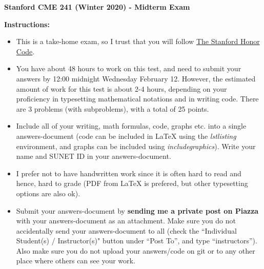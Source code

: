 \documentclass[12pt]{exam}
\begin{document}
\begin{center}
{\large {\bf Stanford CME 241 (Winter 2020) - Midterm Exam}}
\end{center}
{\large{\bf Instructions:}}
\begin{itemize}
\item This is a take-home exam, so I trust that you will follow \href{https://communitystandards.stanford.edu/policies-and-guidance/honor-code}{The Stanford Honor Code}.
\item You have about 48 hours to work on this test, and need to submit your answers by 12:00 midnight Wednesday February 12. However, the estimated amount of work for this test is about 2-4 hours, depending on your proficiency in typesetting mathematical notations and in writing code. There are 3 problems (with subproblems), with a total of 25 points.
\item Include all of your writing, math formulas, code, graphs etc. into a single answers-document (code can be included in LaTeX using the {\em lstlisting} environment, and graphs can be included using {\em includegraphics}). Write your name and SUNET ID in your answers-document.
\item I prefer not to have handwritten work since it is often hard to read and hence, hard to grade (PDF from LaTeX is prefered, but other typesetting options are also ok).
\item Submit your answers-document by {\bf sending me a private post on Piazza} with your answers-document as an attachment. Make sure you do not accidentally send your answers-document to all (check the ``Individual Student(s) / Instructor(s)" button under ``Post To'', and type ``instructors''). Also make sure you do not upload your answers/code on git or to any other place where others can see your work.
\end{itemize}
 
\end{document}
